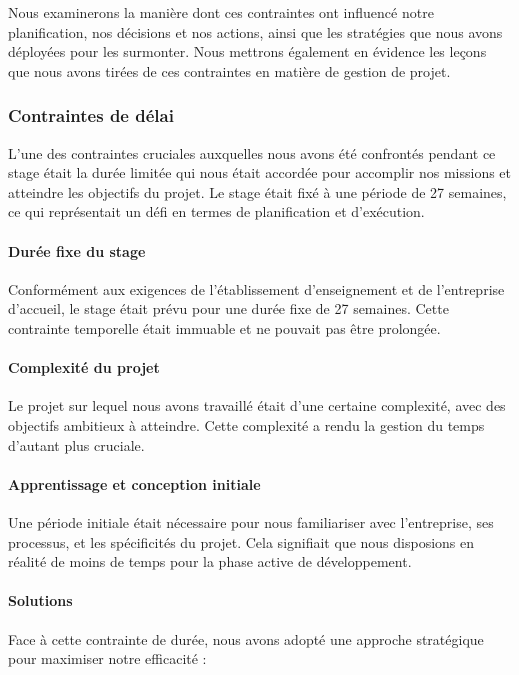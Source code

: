\documentclass[a4paper, 12pt, french]{article}
\begin{document}
					Nous examinerons la manière dont ces contraintes ont influencé notre planification, nos décisions et nos actions, ainsi que les stratégies que nous avons déployées pour les surmonter. Nous mettrons également en évidence les leçons que nous avons tirées de ces contraintes en matière de gestion de projet.
					
					\subsubsection{Contraintes de délai}
						L'une des contraintes cruciales auxquelles nous avons été confrontés pendant ce stage était la durée limitée qui nous était accordée pour accomplir nos missions et atteindre les objectifs du projet. Le stage était fixé à une période de 27 semaines, ce qui représentait un défi en termes de planification et d'exécution.\\

						\paragraph{Durée fixe du stage\\}
							Conformément aux exigences de l'établissement d'enseignement et de l'entreprise d'accueil, le stage était prévu pour une durée fixe de 27 semaines. Cette contrainte temporelle était immuable et ne pouvait pas être prolongée.

						\paragraph{Complexité du projet\\}
							Le projet sur lequel nous avons travaillé était d'une certaine complexité, avec des objectifs ambitieux à atteindre. Cette complexité a rendu la gestion du temps d'autant plus cruciale.

						\paragraph{Apprentissage et conception initiale\\}
							Une période initiale était nécessaire pour nous familiariser avec l'entreprise, ses processus, et les spécificités du projet. Cela signifiait que nous disposions en réalité de moins de temps pour la phase active de développement.

						\paragraph{Solutions\\}
						\noindent
							Face à cette contrainte de durée, nous avons adopté une approche stratégique pour maximiser notre efficacité :
\end{document}
